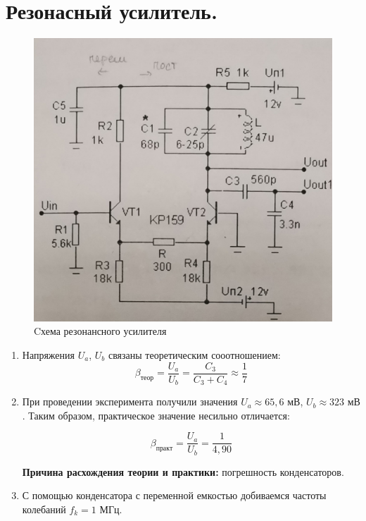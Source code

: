






\section{Резонасный усилитель.}

\begin{figure}[h!]
    \centering
    \includegraphics[width=0.8\linewidth]{pics/schm1.jpg}
    \caption{Cхема резонансного усилителя}
    \label{graph}
\end{figure}

\begin{enumerate}
    \item Напряжения $U_a$, $U_b$ связаны теоретическим сооотношением:
    \[ \beta_{теор}= \frac{U_a}{U_b} = \frac{C_3}{C_3 + C_4} \approx \frac{1}{7} \]

    \item При проведении эксперимента получили значения $U_a \approx 65,6 \text{ мВ}$, $U_b \approx 323 \text{ мВ}$.
    Таким образом, практическое значение несильно отличается:

    \[ \beta_{практ}= \frac{U_a}{U_b} = \frac{1}{4,90} \]

    \textbf{Причина расхождения теории и практики:} погрешность конденсаторов.

    \item С помощью конденсатора с переменной емкостью добиваемся частоты колебаний $f_k = 1 \text{ МГц}$. 

\end{enumerate}

